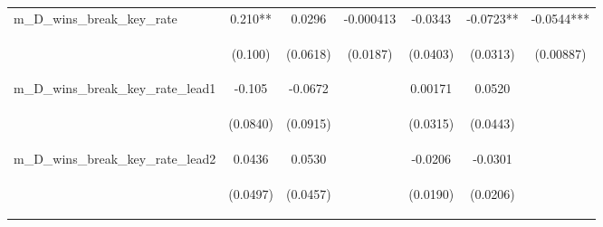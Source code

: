\documentclass[]{article}
\begin{document}
\begin{center}
\begin{tabular}{lcccccc}
m\_D\_wins\_break\_key\_rate & 0.210** & 0.0296 & -0.000413 & -0.0343 & -0.0723** & -0.0544*** \\
\vspace{4pt} & \begin{footnotesize}(0.100)\end{footnotesize} & \begin{footnotesize}(0.0618)\end{footnotesize} & \begin{footnotesize}(0.0187)\end{footnotesize} & \begin{footnotesize}(0.0403)\end{footnotesize} & \begin{footnotesize}(0.0313)\end{footnotesize} & \begin{footnotesize}(0.00887)\end{footnotesize} \\
m\_D\_wins\_break\_key\_rate\_lead1 & -0.105 & -0.0672 &  & 0.00171 & 0.0520 &  \\
\vspace{4pt} & \begin{footnotesize}(0.0840)\end{footnotesize} & \begin{footnotesize}(0.0915)\end{footnotesize} & \begin{footnotesize}\end{footnotesize} & \begin{footnotesize}(0.0315)\end{footnotesize} & \begin{footnotesize}(0.0443)\end{footnotesize} & \begin{footnotesize}\end{footnotesize} \\
m\_D\_wins\_break\_key\_rate\_lead2 & 0.0436 & 0.0530 &  & -0.0206 & -0.0301 &  \\
\vspace{4pt} & \begin{footnotesize}(0.0497)\end{footnotesize} & \begin{footnotesize}(0.0457)\end{footnotesize} & \begin{footnotesize}\end{footnotesize} & \begin{footnotesize}(0.0190)\end{footnotesize} & \begin{footnotesize}(0.0206)\end{footnotesize} & \begin{footnotesize}\end{footnotesize} \\

\end{tabular}
\end{center}
\end{document}

